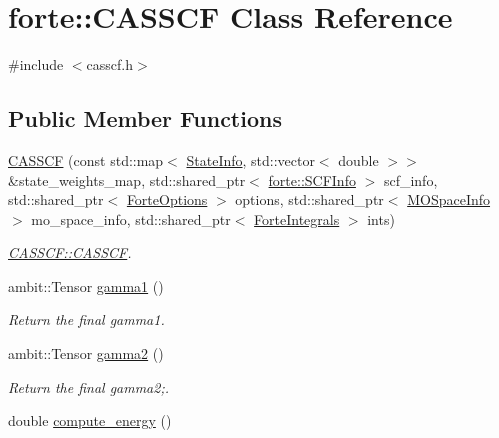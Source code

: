 \hypertarget{classforte_1_1_c_a_s_s_c_f}{}\section{forte\+:\+:C\+A\+S\+S\+CF Class Reference}
\label{classforte_1_1_c_a_s_s_c_f}


{\ttfamily \#include $<$casscf.\+h$>$}

\subsection*{Public Member Functions}
\begin{DoxyCompactItemize}
\item 
\mbox{\hyperlink{classforte_1_1_c_a_s_s_c_f_a8c427d619073161c17ce1ad2de104667}{C\+A\+S\+S\+CF}} (const std\+::map$<$ \mbox{\hyperlink{classforte_1_1_state_info}{State\+Info}}, std\+::vector$<$ double $>$$>$ \&state\+\_\+weights\+\_\+map, std\+::shared\+\_\+ptr$<$ \mbox{\hyperlink{classforte_1_1_s_c_f_info}{forte\+::\+S\+C\+F\+Info}} $>$ scf\+\_\+info, std\+::shared\+\_\+ptr$<$ \mbox{\hyperlink{classforte_1_1_forte_options}{Forte\+Options}} $>$ options, std\+::shared\+\_\+ptr$<$ \mbox{\hyperlink{classforte_1_1_m_o_space_info}{M\+O\+Space\+Info}} $>$ mo\+\_\+space\+\_\+info, std\+::shared\+\_\+ptr$<$ \mbox{\hyperlink{classforte_1_1_forte_integrals}{Forte\+Integrals}} $>$ ints)
\begin{DoxyCompactList}\small\item\em \mbox{\hyperlink{classforte_1_1_c_a_s_s_c_f_a8c427d619073161c17ce1ad2de104667}{C\+A\+S\+S\+C\+F\+::\+C\+A\+S\+S\+CF}}. \end{DoxyCompactList}\item 
ambit\+::\+Tensor \mbox{\hyperlink{classforte_1_1_c_a_s_s_c_f_a221e64b6cc67b8d5aa6abc6b8023ef81}{gamma1}} ()
\begin{DoxyCompactList}\small\item\em Return the final gamma1. \end{DoxyCompactList}\item 
ambit\+::\+Tensor \mbox{\hyperlink{classforte_1_1_c_a_s_s_c_f_a2fc7d80dcaa59c4c10af2c0764663875}{gamma2}} ()
\begin{DoxyCompactList}\small\item\em Return the final gamma2;. \end{DoxyCompactList}\item 
double \mbox{\hyperlink{classforte_1_1_c_a_s_s_c_f_a7f604a31c632b2241917af6227705ef5}{compute\+\_\+energy}} ()
$$
\end{DoxyCompactItemize}
